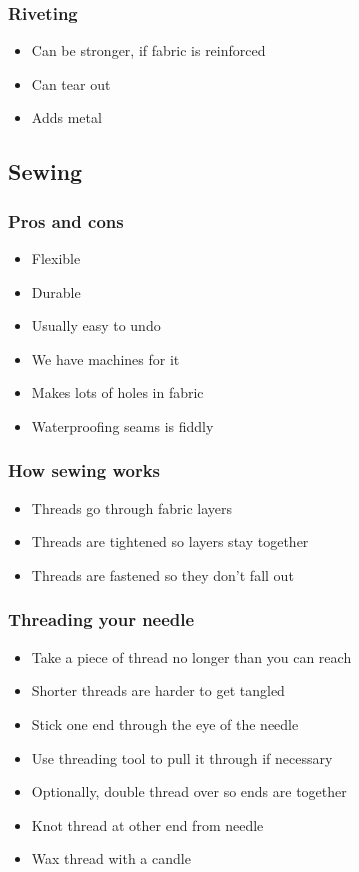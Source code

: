 \documentclass{beamer}
\begin{document}
\begin{frame}[fragile]
\frametitle{Riveting}
\begin{itemize}[<+(1)->]
\item Can be stronger, if fabric is reinforced
\item Can tear out
\item Adds metal
\end{itemize}
\end{frame}

\subsection{Sewing}

\begin{frame}[fragile]
\frametitle{Pros and cons}
\begin{itemize}[<+(1)->]
\item Flexible
\item Durable
\item Usually easy to undo
\item We have machines for it
\item Makes lots of holes in fabric
\item Waterproofing seams is fiddly
\end{itemize}
\end{frame}

\begin{frame}[fragile]
\frametitle{How sewing works}
\begin{itemize}[<+(1)->]
\item Threads go through fabric layers
\item Threads are tightened so layers stay together
\item Threads are fastened so they don't fall out
\end{itemize}
\end{frame}

\begin{frame}[fragile]
\frametitle{Threading your needle}
\begin{itemize}[<+(1)->]
\item Take a piece of thread no longer than you can reach
\item Shorter threads are harder to get tangled
\item Stick one end through the eye of the needle
\item Use threading tool to pull it through if necessary
\item Optionally, double thread over so ends are together
\item Knot thread at other end from needle
\item Wax thread with a candle
\end{itemize}
\end{frame}
\end{document}
